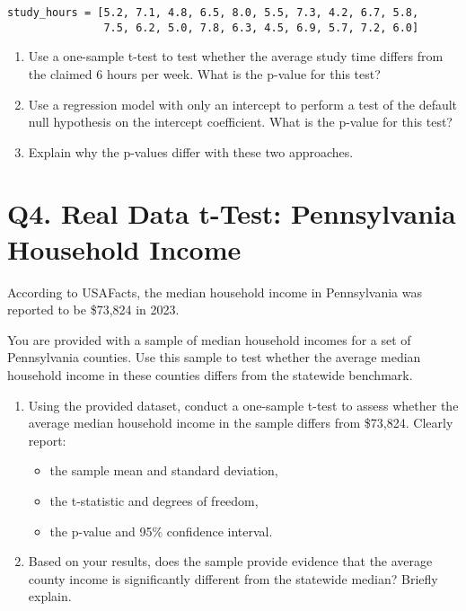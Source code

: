 \documentclass[12pt]{article}
\begin{document}
\begin{verbatim}
study_hours = [5.2, 7.1, 4.8, 6.5, 8.0, 5.5, 7.3, 4.2, 6.7, 5.8, 
               7.5, 6.2, 5.0, 7.8, 6.3, 4.5, 6.9, 5.7, 7.2, 6.0]
\end{verbatim}

\begin{enumerate}[label=\alph*)]
    \item Use a one-sample t-test to test whether the average study time differs from the claimed 6 hours per week. What is the p-value for this test?
    
    \vspace{3cm}
    
    \item Use a regression model with only an intercept to perform a test of the default null hypothesis on the intercept coefficient. What is the p-value for this test?
    
    \vspace{3cm}
    
    \item Explain why the p-values differ with these two approaches.
    
    \vspace{3cm}
\end{enumerate}

\section*{Q4. Real Data t-Test: Pennsylvania Household Income}

According to USAFacts, the median household income in Pennsylvania was reported to be \$73{,}824 in 2023.

You are provided with a sample of median household incomes for a set of Pennsylvania counties. Use this sample to test whether the average median household income in these counties differs from the statewide benchmark.

\begin{enumerate}[label=\alph*)]
\item Using the provided dataset, conduct a one-sample t-test to assess whether the average median household income in the sample differs from \$73{,}824. Clearly report:
\begin{itemize}
\item the sample mean and standard deviation,
\item the t-statistic and degrees of freedom,
\item the p-value and 95\% confidence interval.
\end{itemize}

\item Based on your results, does the sample provide evidence that the average county income is significantly different from the statewide median? Briefly explain.

\end{enumerate}
\end{document}
